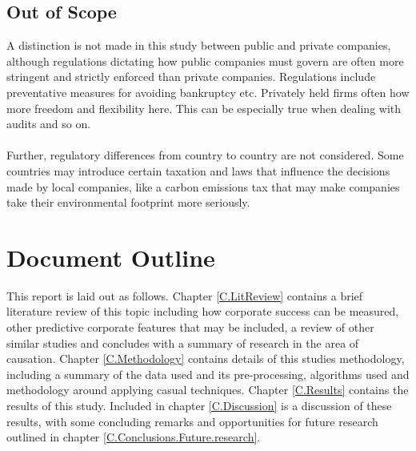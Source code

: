 {\subsection{Out of Scope}
{A distinction is not made in this study between public and private companies, although regulations dictating how public companies must govern are often more stringent and strictly enforced than private companies. Regulations include preventative measures for avoiding bankruptcy etc. Privately held firms often how more freedom and flexibility here. This can be especially true when dealing with audits and so on. \\\\
Further, regulatory differences from country to country are not considered. Some countries may introduce certain taxation and laws that influence the decisions made by local companies, like a carbon emissions tax that may make companies take their environmental footprint more seriously.} 
}
\section{Document Outline}
{This report is laid out as follows. Chapter \ref{C.LitReview} contains a brief literature review of this topic including how corporate success can be measured, other predictive corporate features that may be included, a review of other similar studies and concludes with a summary of research in the area of causation. Chapter \ref{C.Methodology} contains details of this studies methodology, including a summary of the data used and its pre-processing, algorithms used and methodology around applying casual techniques. Chapter \ref{C.Results} contains the results of this study. Included in chapter \ref{C.Discussion} is a discussion of these results, with some concluding remarks and opportunities for future research outlined in chapter \ref{C.Conclusions.Future.research}.      }
